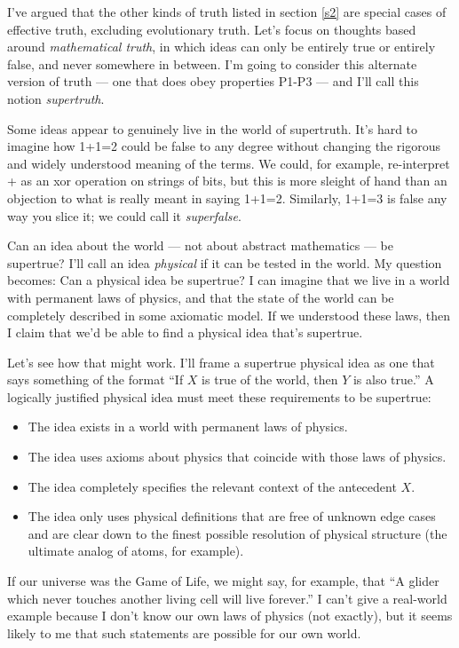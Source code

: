 \documentclass[9pt, twoside]{book}
\theoremstyle{argtstyle}
\begin{document}
I've argued that the other kinds of truth listed in section \ref{s2}
are special cases of effective truth, excluding evolutionary truth.
Let's focus on thoughts based around {\em mathematical truth}, in which ideas
can only be
entirely true or entirely false, and never somewhere in between.
I'm going to consider this alternate version
of truth --- one that does obey properties P1-P3 --- and I'll call this notion
{\em supertruth}.

Some ideas appear to genuinely live in the world of supertruth. It's hard to
imagine how 1+1=2 could be false to any degree without changing the rigorous and
widely understood meaning of the terms. We could, for example,
re-interpret + as an xor operation on strings of
bits, but this is more sleight of hand than an objection to what is
really meant in saying 1+1=2. Similarly, 1+1=3 is false any way you slice it; we
could call it {\em superfalse}.

Can an idea about the world --- not about abstract mathematics ---
be supertrue?
I'll call an idea {\em physical} if it can be tested in the world.
My question becomes: Can a physical idea be supertrue?
I can imagine that we live in a world with permanent laws of physics, and that
the
state of the world can be completely described in some axiomatic
model.
If we understood these laws, then I claim that we'd be able to find
a physical idea that's supertrue.

Let's see how that might work.
I'll frame a supertrue physical idea as one that says something of the format
``If $X$ is
true of the world, then $Y$ is also true.''
A logically justified physical idea must meet these
requirements to be supertrue:
\begin{itemize}
    \item The idea exists in a world with permanent laws of physics.
    \item The idea uses axioms about physics that coincide with those laws of
        physics.
    \item The idea completely specifies the relevant context of the antecedent
        $X$.
    \item The idea only uses physical definitions that are free of unknown edge
        cases and are clear down to
        the finest possible resolution of physical structure (the
        ultimate analog of atoms, for example).
\end{itemize}
If our universe was the Game of Life, we might say, for example, that
``A glider which never touches another living cell will live forever.''
I can't give a real-world example because I don't know our own laws of physics (not
exactly), but it
seems likely to me that such statements are possible for our own world.
\end{document}
